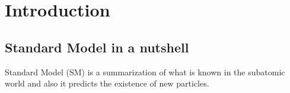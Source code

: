 \section{Introduction}
\label{label:intro}

\subsection{Standard Model in a nutshell}
Standard Model (SM) is a summarization of what is known in the subatomic world and also it predicts 
the existence of new particles.  
